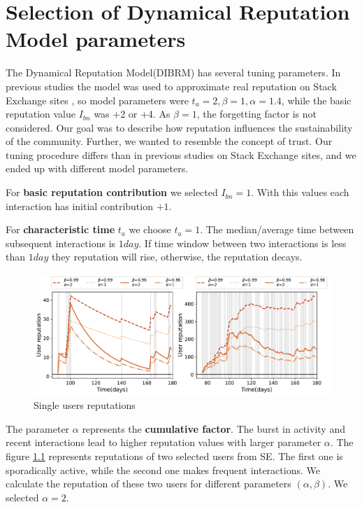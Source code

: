 \chapter{Selection of Dynamical Reputation Model parameters}
\label{App:parameters}

The Dynamical Reputation Model(DIBRM) has several tuning parameters. In previous studies the model \cite{melnikov2018toward,yashkina2020} was used to approximate real reputation on Stack Exchange sites \cite{yashkina2020}, so model parameters were $t_a =2, \beta = 1, \alpha = 1.4$, while the basic reputation value $I_{bn}$ was +2 or +4. As $\beta=1$, the forgetting factor is not considered. Our goal was to describe how reputation influences the sustainability of the community. Further, we wanted to resemble the concept of trust. Our tuning procedure differs than in previous studies on Stack Exchange sites, and we ended up with different model parameters. 

For \textbf{basic reputation contribution} we selected $I_{bn}=1$. With this values each interaction has initial contribution $+1$. 

For \textbf{characteristic time} $t_a$ we choose $t_a=1$. The median/average time between subsequent interactions is $1 day$. If time window between two interactions is less than $1 day$ they reputation will rise, otherwise, the reputation decays.

\begin{figure}[h]
	\centering
	\includegraphics[width=0.8\linewidth]{figures/stackexchange/single_user_reputation.pdf}
	\caption[Single users reputations.]{Single users reputations }
	\label{fig:singleuser}
\end{figure} 

The {parameter $\alpha$} represents the \textbf{cumulative factor}. The burst in activity and recent interactions lead to higher reputation values with larger parameter $\alpha$. The figure \ref{fig:singleuser} represents reputations of two selected users from SE. The first one is sporadically active, while the second one makes frequent interactions. We calculate the reputation of these two users for different parameters $(\alpha, \beta)$. We selected $\alpha=2$.  

